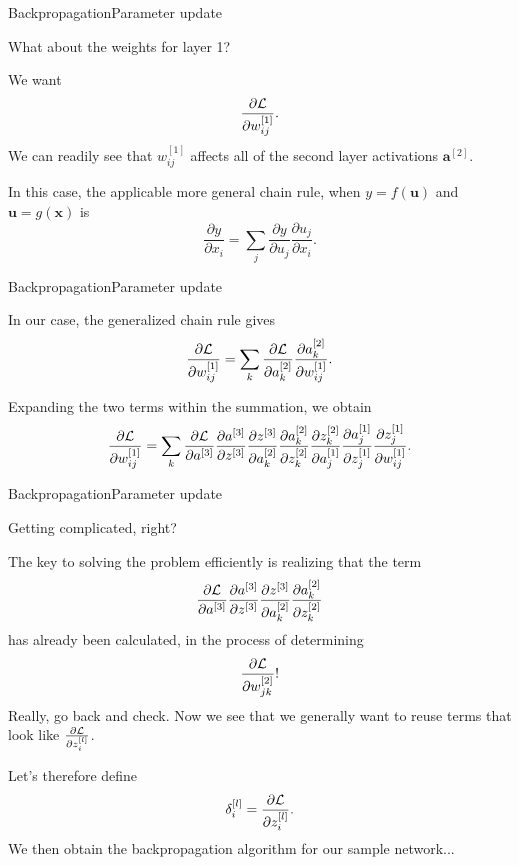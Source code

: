 \documentclass{beamer}
\renewcommand{\vec}[1]{\boldsymbol{#1}}
\begin{document}
\begin{frame}{Backpropagation}{Parameter update}

  What about the weights for \alert{layer 1}?

  \medskip
  
  We want
  \[ \frac{\partial \cal L}{\partial w^{[1]}_{ij}}. \]
  We can readily see that $w^{[1]}_{ij}$ affects \alert{all} of the
  second layer activations $\vec{a}^{[2]}$.

  \medskip

  In this case, the applicable more general chain rule,
  when $y = f(\vec{u})$ and $\vec{u} = g(\vec{x})$ is 
  \[ \frac{\partial y}{\partial x_i} = \sum_j \frac{\partial y}{\partial u_j}
  \frac{\partial u_j}{\partial x_i}. \]

\end{frame}


\begin{frame}{Backpropagation}{Parameter update}

  In our case, the generalized chain rule gives  
  \[ \frac{\partial \cal L}{\partial w^{[1]}_{ij}} = \sum_k
  \frac{\partial \cal L}{\partial a^{[2]}_k}
  \frac{\partial a^{[2]}_k}{\partial w^{[1]}_{ij}} . \]
  
  \medskip

  Expanding the two terms within the summation, we obtain
  \[ \frac{\partial \cal L}{\partial w^{[1]}_{ij}} = \sum_k
  \frac{\partial \cal L}{\partial a^{[3]}}
  \frac{\partial a^{[3]}}{\partial z^{[3]}}
  \frac{\partial z^{[3]}}{\partial a^{[2]}_k}
  \frac{\partial a^{[2]}_k}{\partial z^{[2]}_k}
  \frac{\partial z^{[2]}_k}{\partial a^{[1]}_j}
  \frac{\partial a^{[1]}_j}{\partial z^{[1]}_j}
  \frac{\partial z^{[1]}_j}{\partial w^{[1]}_{ij}} . \]
  
\end{frame}


\begin{frame}{Backpropagation}{Parameter update}

  Getting complicated, right?

  \medskip

  The key to solving the problem efficiently is realizing that the term
  \[ \frac{\partial \cal L}{\partial a^{[3]}}
  \frac{\partial a^{[3]}}{\partial z^{[3]}}
  \frac{\partial z^{[3]}}{\partial a^{[2]}_k}
  \frac{\partial a^{[2]}_k}{\partial z^{[2]}_k} \]
  has already been calculated, in the process of determining
  \[ \frac{\partial \cal L}{\partial w^{[2]}_{jk}} ! \]
  Really, go back and check.
  Now we see that we generally want to reuse terms that look like
  $\frac{\partial \cal L}{\partial z^{[l]}_i}$.

  \medskip
  
  Let's therefore define
  \[ \delta^{[l]}_i = \frac{\partial \cal L}{\partial z^{[l]}_i} .\]
  We then obtain the backpropagation algorithm for our sample network...


\end{frame}
\end{document}

